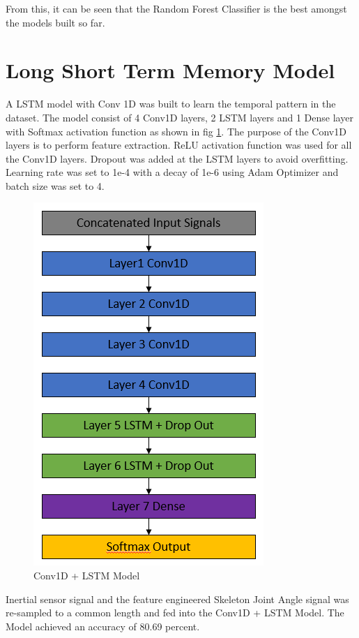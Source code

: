 \documentclass[conference]{IEEEtran}
\begin{document}
From this, it can be seen that the Random Forest Classifier is the best amongst the models built so far.

\section{Long Short Term Memory Model}

A LSTM model with Conv 1D was built to learn the temporal pattern in the dataset. The model consist of 4 Conv1D layers, 2 LSTM layers and 1 Dense layer with Softmax activation function as shown in fig \ref{fig:LSTM_Model}. The purpose of the Conv1D layers is to perform feature extraction. ReLU activation function was used for all the Conv1D layers. Dropout was added at the LSTM layers to avoid overfitting. Learning rate was set to 1e-4 with a decay of 1e-6 using Adam Optimizer and batch size was set to 4. 

\begin{figure}[H]
\begin{center}
\includegraphics[scale=0.8]{Image/LSTM_Model.png}
\caption{\label{fig:LSTM_Model} Conv1D + LSTM Model}
\end{center}
\end{figure}
 
 Inertial sensor signal and the feature engineered Skeleton Joint Angle signal was re-sampled to a common length and fed into the Conv1D + LSTM Model. The Model achieved an accuracy of 80.69 percent.
 
\end{document}
